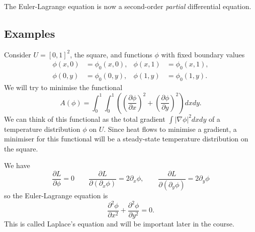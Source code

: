 \begin{rmk}
The Euler-Lagrange equation is now a second-order \emph{partial} differential equation.
\end{rmk}

\subsection{Examples}

\begin{exm}
Consider $U=[0,1]^2$, the square, and functions $\phi$ with fixed boundary values
\begin{align*}
\phi(x,0)&=\phi_0(x,0),&\phi(x,1)&=\phi_0(x,1),\\
\phi(0,y)&=\phi_0(0,y),&\phi(1,y)&=\phi_0(1,y).
\end{align*}
We will try to minimise the functional
\[A(\phi)=\int_0^1\int_0^1\left(\left(\frac{\partial\phi}{\partial x}\right)^2+\left(\frac{\partial\phi}{\partial y}\right)^2\right)dx dy.\]
We can think of this functional as the total gradient $\int|\nabla\phi|^2dxdy$ of a temperature distribution $\phi$ on $U$. Since heat flows to minimise a gradient, a minimiser for this functional will be a steady-state temperature distribution on the square.

We have
\[\frac{\partial L}{\partial \phi}=0\qquad\frac{\partial L}{\partial(\partial_x\phi)}=2\partial_x\phi,\qquad\frac{\partial L}{\partial(\partial_y\phi)}=2\partial_y\phi\]
so the Euler-Lagrange equation is
\[\frac{\partial^2\phi}{\partial x^2}+\frac{\partial^2\phi}{\partial y^2}=0.\]
This is called Laplace's equation and will be important later in the course.
\end{exm}

